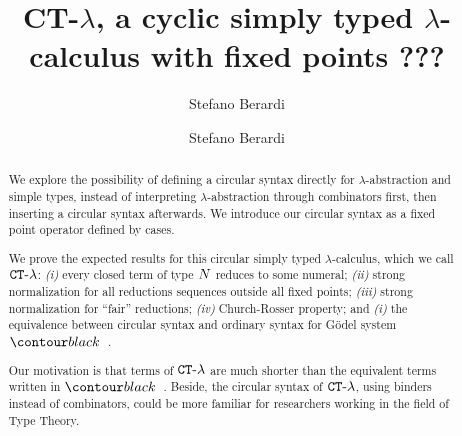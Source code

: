 \ifdraft

\title{CT-$\lambda$, a cyclic simply typed $\lambda$-calculus with fixed points}

\author{Stefano Berardi }
\date{}

\else

\title[Equivalence]
{
???
}

\author[S. Berardi]{Stefano Berardi}
\address{Universit\`{a} di Torino,
Torino, Italy}


\fi

\maketitle

\begin{abstract}
We explore the possibility of defining a circular syntax
directly for $\lambda$-abstraction and simple types, instead of interpreting
 $\lambda$-abstraction through combinators first, then inserting a  circular syntax afterwards.
We introduce our circular syntax as a fixed point operator defined by cases.

We prove the expected results for this circular simply typed $\lambda$-calculus, which we call ${ {\tt CT} \mbox{-} \lambda}$: 
\emph{(i)} every closed term of type ${N}$ reduces to some numeral;
\emph{(ii)}  strong normalization for all reductions sequences outside all fixed points; 
\emph{(iii)}  strong normalization for ``fair'' reductions; \emph{(iv)} Church-Rosser property;
and \emph{(i)} the equivalence between circular syntax and ordinary syntax 
for G\"{o}del system $\systemT$. 

Our motivation is that terms of ${ {\tt CT} \mbox{-} \lambda}$ 
are much shorter than the equivalent terms written in $\systemT$.
Beside, the circular syntax of ${ {\tt CT} \mbox{-} \lambda}$, using binders instead of combinators, 
could be more familiar for researchers working in the field of Type Theory.

\end{abstract}

\iffalse
key words: 
proof theory,
inductive definitions,
Brotherston-Simpson conjecture,
cyclic proofs,
Martin-Lof's system of inductive definitions,
infinite Ramsey theorem
Podelski-Rybalchenko termination theorem
size-change termination theorem
\fi